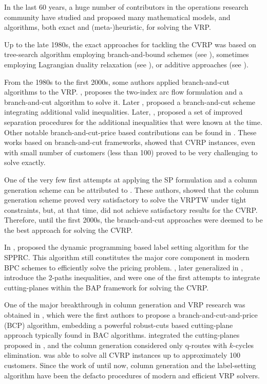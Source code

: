 In the last 60 years, a huge number of contributors in
the operations research community have studied and proposed many
mathematical models, and algorithms, both exact and (meta-)heuristic,
for solving the VRP.

Up to the late 1980s, the exact approaches for tackling the CVRP was
based on tree-search algorithm employing branch-and-bound schemes
(see \textcite{christofides1969a, christofides1981, laporte1986}),
sometimes employing Lagrangian duality relaxation (see \textcite{fisher1994a, miller1995}),
or additive approaches (see \textcite{fischetti1994a, hadjiconstantinou1995}).

From the 1980s to the first 2000s, some authors applied branch-and-cut
algorithms to the VRP.
\textcite{laporte1985}, proposes the two-index arc flow formulation
and a branch-and-cut algorithm to solve it.
Later \textcite{augerat1995a}, proposed a branch-and-cut scheme
integrating additional valid inequalities.
Later, \textcite{lysgaard2004},
proposed a set of improved separation procedures for
the additional inequalities that were known at the time.
Other notable branch-and-cut-price based contributions
can be found in \textcite{araqueg1994, augerat1995, achuthan1996, blasum2000, ralphs2003, achuthan2003, baldacci2004}.
These works based on branch-and-cut frameworks, showed that CVRP instances,
even with small number of customers (less than 100) proved
to be very challenging to solve exactly.


One of the very few first attempts at applying
the SP formulation and a column generation scheme can
be attributed to \textcite{desrosiers1984, agarwal1989}.
These authors, showed that the column generation scheme proved
very satisfactory to solve the VRPTW under tight constraints,
but, at that time, did not achieve satisfactory results for the CVRP.
Therefore, until the first 2000s, the branch-and-cut approaches
were deemed to be the best approach for solving the CVRP.

In \citeyear{desrochers1992}, \citeauthor{desrochers1992}
proposed the dynamic programming based label setting algorithm for the SPPRC.
This algorithm still constitutes the major core component
in modern BPC schemes to efficiently solve the pricing problem.
\textcite{kohl1999}, later generalized in \cite{desaulniers2008}, introduce the
2-paths inequalities, and were one of the first attempts to integrate
cutting-planes within the BAP framework for solving the CVRP.

One of the major breakthrough in column generation and VRP research
was obtained in \textcite{fukasawa2006}, which were the
first authors to propose a branch-and-cut-and-price (BCP) algorithm,
embedding a powerful robust-cuts based cutting-plane approach
typically found in BAC algorithms.
\citeauthor{fukasawa2006} integrated the cutting-planes proposed in \cite{lysgaard2004},
and the column generation considered only q-routes with $k$-cycles elimination.
\textcite{fukasawa2006} was able to solve all CVRP instances up to approximately 100 customers.
Since the work of \citeauthor{fukasawa2006} until now, column generation
and the label-setting algorithm have been the defacto procedures
of modern and efficient VRP solvers.

